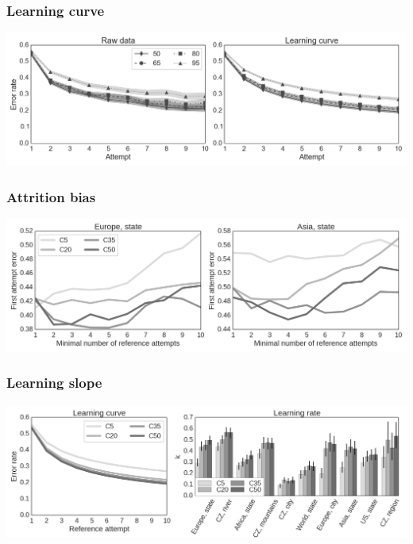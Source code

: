 \documentclass[bigger]{beamer}
\begin{document}
\begin{frame}
  \frametitle{Learning curve}
  \includegraphics[width=\textwidth]{img/learning_curve_combined}
\end{frame}



\begin{frame}
  \frametitle{Attrition bias}
  \includegraphics[width=\textwidth]{img/target_difficulty_attrition_bias_contexts_selected}
\end{frame}

\begin{frame}
  \frametitle{Learning slope}
  \includegraphics[width=\textwidth]{img/target_difficulty_context_learning_slope}
\end{frame}
\end{document}
